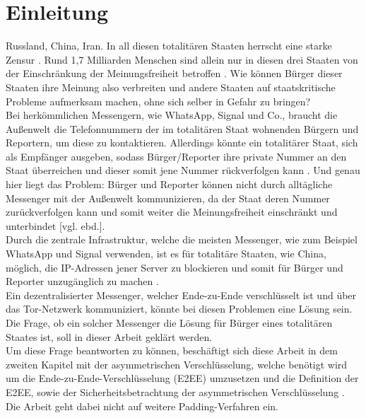 \documentclass[a4paper,ngerman, headheight=28pt,12pt]{scrartcl}
\newcommand{\vcite}[1]{\cite[vgl.][]{#1}}
\newcommand{\vebd}{[vgl. ebd.]}
\begin{document}

\tableofcontents
\setcounter{page}{0}
\thispagestyle{empty}
\vspace{0.5cm}
\pagebreak


\linenumbers{}
\modulolinenumbers[5]
\section{Einleitung}
Russland, China, Iran. In all diesen totalitären Staaten herrscht eine starke Zensur \vcite{AmnReport}. Rund 1,7 Milliarden Menschen sind allein nur in diesen drei Staaten von der Einschränkung der Meinungsfreiheit betroffen \vcite{UnPop}. Wie können Bürger
dieser Staaten ihre Meinung also verbreiten und andere Staaten auf
staatskritische Probleme aufmerksam machen, ohne sich selber in Gefahr zu bringen?
\\
Bei herkömmlichen Messengern, wie WhatsApp, Signal und Co., braucht die Außenwelt die Telefonnummern der im totalitären Staat wohnenden Bürgern und Reportern, um diese zu kontaktieren. Allerdings könnte ein totalitärer Staat, sich als Empfänger ausgeben, sodass Bürger/Reporter ihre private Nummer an den Staat überreichen und dieser somit jene Nummer rückverfolgen kann \vcite{LocPolice}.
Und genau hier liegt das Problem: Bürger und Reporter können nicht durch alltägliche Messenger mit der Außenwelt kommunizieren, da der Staat deren Nummer zurückverfolgen kann und somit weiter die Meinungsfreiheit einschränkt und unterbindet \vebd.
\\
Durch die zentrale Infrastruktur, welche die meisten Messenger, wie zum Beispiel WhatsApp und Signal verwenden, ist es für totalitäre Staaten, wie China, möglich, die IP-Adressen jener Server zu blockieren und somit für Bürger und Reporter unzugänglich zu machen \vcite{ChinaFirewall,CentralizedWhatsapp}.
\\
Ein dezentralisierter Messenger, welcher Ende-zu-Ende verschlüsselt ist und über das Tor-Netzwerk kommuniziert, könnte bei diesen Problemen eine Lösung sein. Die Frage, ob ein solcher Messenger die Lösung für Bürger eines totalitären Staates ist, soll in dieser Arbeit geklärt werden.
\\
Um diese Frage beantworten zu können, beschäftigt sich diese Arbeit in dem zweiten Kapitel mit der asymmetrischen Verschlüsselung, welche benötigt wird um die Ende-zu-Ende-Verschlüsselung (E2EE) umzusetzen und die Definition der E2EE, sowie der Sicherheitsbetrachtung der asymmetrischen Verschlüsselung \vcite{E2EE-Method}. Die Arbeit geht dabei nicht auf weitere Padding-Verfahren ein.
\end{document}

